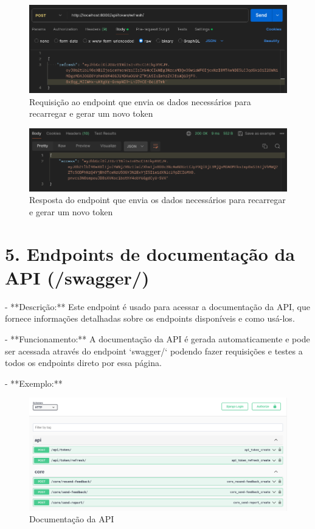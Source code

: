 \begin{figure}[H]
    \centering
    \includegraphics[width=1\textwidth]{figuras/refresh.png}
    \caption{Requisição ao endpoint que envia os dados necessários para recarregar e gerar um novo token}
    \label{fig:report_questions}
\end{figure}

\begin{figure}[H]
    \centering
    \includegraphics[width=1\textwidth]{figuras/refresh_result.png}
    \caption{Resposta do endpoint que envia os dados necessários para recarregar e gerar um novo token}
    \label{fig:report_questions}
\end{figure}

\section*{5. Endpoints de documentação da API (/swagger/)}

- **Descrição:** Este endpoint é usado para acessar a documentação da API, que fornece informações detalhadas sobre os endpoints disponíveis e como usá-los.

- **Funcionamento:** A documentação da API é gerada automaticamente e pode ser acessada através do endpoint `swagger/` podendo fazer requisições e testes a todos os endpoints direto por essa página.

- **Exemplo:**

\begin{figure}[H]
    \centering
    \includegraphics[width=1\textwidth]{figuras/swagger.png}
    \caption{Documentação da API}
    \label{fig:report_questions}
\end{figure}

